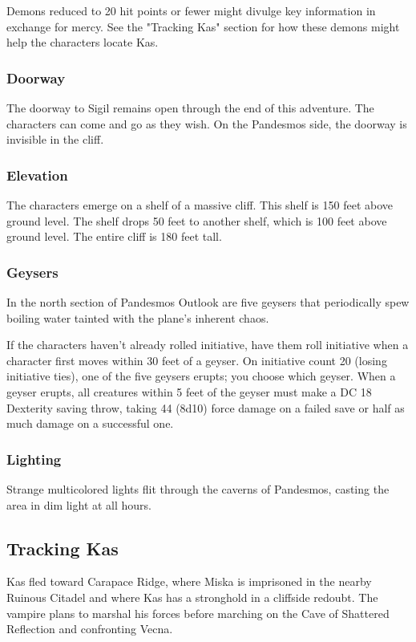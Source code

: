 \documentclass[10pt,a4paper,twoside,bg=print,twocolumn,openany,nodeprecatedcode]{dndbook}
\begin{document}
Demons reduced to 20 hit points or fewer might divulge key information in exchange for mercy. See the "Tracking Kas" section for how these demons might help the characters locate Kas.

\subsubsection{Doorway}
The doorway to Sigil remains open through the end of this adventure. The characters can come and go as they wish. On the Pandesmos side, the doorway is invisible in the cliff.

\subsubsection{Elevation}
The characters emerge on a shelf of a massive cliff. This shelf is 150 feet above ground level. The shelf drops 50 feet to another shelf, which is 100 feet above ground level. The entire cliff is 180 feet tall.

\subsubsection{Geysers}
In the north section of Pandesmos Outlook are five geysers that periodically spew boiling water tainted with the plane's inherent chaos.

If the characters haven't already rolled initiative, have them roll initiative when a character first moves within 30 feet of a geyser. On initiative count 20 (losing initiative ties), one of the five geysers erupts; you choose which geyser. When a geyser erupts, all creatures within 5 feet of the geyser must make a DC 18 Dexterity saving throw, taking 44 (8d10) force damage on a failed save or half as much damage on a successful one.

\subsubsection{Lighting}
Strange multicolored lights flit through the caverns of Pandesmos, casting the area in dim light at all hours.

\subsection{Tracking Kas}
Kas fled toward Carapace Ridge, where Miska is imprisoned in the nearby Ruinous Citadel and where Kas has a stronghold in a cliffside redoubt. The vampire plans to marshal his forces before marching on the Cave of Shattered Reflection and confronting Vecna.
\end{document}
